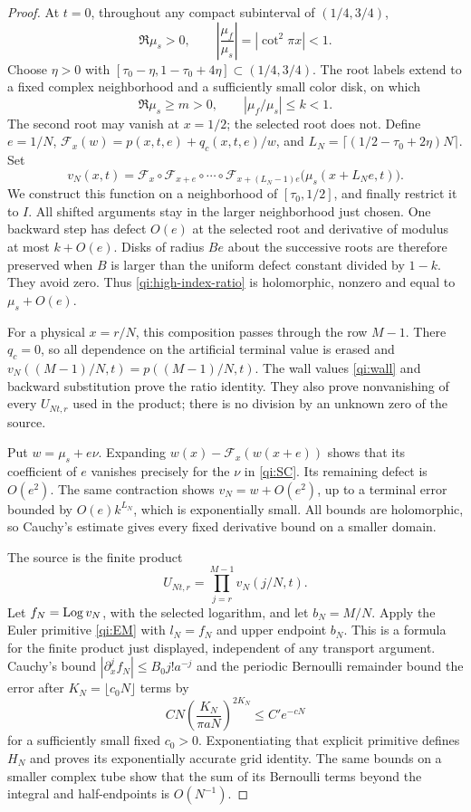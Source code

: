 \begin{proof}
At $t=0$, throughout any compact subinterval of $(1/4,3/4)$,
\[
 \Re\mu_s>0,\qquad
 \left|\frac{\mu_f}{\mu_s}\right|=|\cot^2\pi x|<1.
\]
Choose $\eta>0$ with
$[\tau_0-\eta,1-\tau_0+4\eta]\subset(1/4,3/4)$.
The root labels extend to a fixed complex neighborhood and a
sufficiently small color disk, on which
\begin{equation}\label{qi:high-index-gap}
 \Re\mu_s\ge m>0,\qquad |\mu_f/\mu_s|\le k<1.
\end{equation}
The second root may vanish at $x=1/2$; the selected root does not.
Define $e=1/N$,
$\mathcal F_x(w)=p(x,t,e)+q_c(x,t,e)/w$, and
$L_N=\lceil(1/2-\tau_0+2\eta)N\rceil$. Set
\begin{equation}\label{qi:high-index-ratio}
 v_N(x,t)=\mathcal F_x\circ\mathcal F_{x+e}\circ\cdots
 \circ\mathcal F_{x+(L_N-1)e}
       \bigl(\mu_s(x+L_Ne,t)\bigr).
\end{equation}
We construct this function on a neighborhood of $[\tau_0,1/2]$,
and finally restrict it to $I$. All shifted arguments stay in the
larger neighborhood just chosen. One
backward step has defect $O(e)$ at the selected root and derivative
of modulus at most $k+O(e)$. Disks of radius $Be$ about the
successive roots are therefore preserved when $B$ is larger than
the uniform defect constant divided by $1-k$. They avoid zero.
Thus \eqref{qi:high-index-ratio} is holomorphic, nonzero and equal
to $\mu_s+O(e)$.

For a physical $x=r/N$, this composition passes through the row
$M-1$. There $q_c=0$, so all dependence on the artificial terminal value is erased and
$v_N((M-1)/N,t)=p((M-1)/N,t)$. The wall values
\eqref{qi:wall} and backward substitution prove the ratio identity.
They also prove nonvanishing of every $U_{Nt,r}$ used in the product;
there is no division by an unknown zero of the source.

Put $w=\mu_s+e\nu$. Expanding
$w(x)-\mathcal F_x(w(x+e))$ shows that its coefficient of $e$
vanishes precisely for the $\nu$ in \eqref{qi:SC}.
Its remaining defect is $O(e^2)$. The same contraction shows
$v_N=w+O(e^2)$, up to a terminal error bounded by $O(e)k^{L_N}$,
which is exponentially small. All bounds are holomorphic, so
Cauchy's estimate gives every fixed derivative bound on a smaller
domain.

The source is the finite product
\[
 U_{Nt,r}=\prod_{j=r}^{M-1}v_N(j/N,t).
\]
Let $f_N=\operatorname{Log} v_N$, with the selected logarithm, and let $b_N=M/N$.
Apply the Euler primitive \eqref{qi:EM} with $l_N=f_N$ and upper
endpoint $b_N$. This is a formula for the finite product just
displayed, independent of any transport argument. Cauchy's bound
$|\partial_x^j f_N|\le B_0j!a^{-j}$ and the periodic Bernoulli
remainder bound the error after $K_N=\lfloor c_0N\rfloor$ terms by
\[
 C N\left(\frac{K_N}{\pi aN}\right)^{2K_N}
       \le C'e^{-cN}
\]
for a sufficiently small fixed $c_0>0$. Exponentiating that explicit
primitive defines $H_N$ and proves its exponentially accurate grid
identity. The same bounds on a smaller complex tube show that the
sum of its Bernoulli terms beyond the integral and half-endpoints
is $O(N^{-1})$.


\end{proof}
